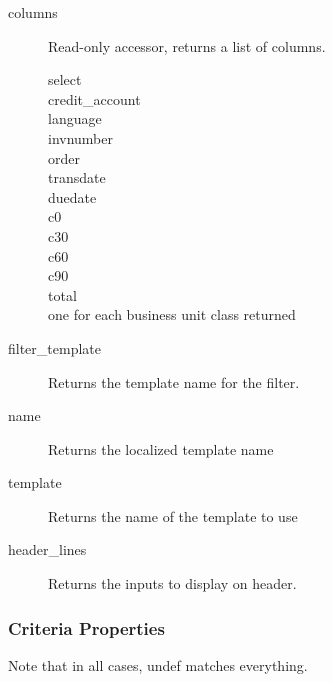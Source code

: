 \begin{description}
\begin{description}
\begin{description}
\begin{description}
\begin{description}
\begin{description}
\begin{description}
\begin{description}
\begin{description}
\begin{description}
\begin{description}
\item[{columns}] \mbox{}

Read-only accessor, returns a list of columns.

\begin{description}

\item[{select}] \mbox{}
\item[{credit\_account}] \mbox{}
\item[{language}] \mbox{}
\item[{invnumber}] \mbox{}
\item[{order}] \mbox{}
\item[{transdate}] \mbox{}
\item[{duedate}] \mbox{}
\item[{c0}] \mbox{}
\item[{c30}] \mbox{}
\item[{c60}] \mbox{}
\item[{c90}] \mbox{}
\item[{total}] \mbox{}
\item[{one for each business unit class returned}] \mbox{}\end{description}

\item[{filter\_template}] \mbox{}

Returns the template name for the filter.


\item[{name}] \mbox{}

Returns the localized template name


\item[{template}] \mbox{}

Returns the name of the template to use


\item[{header\_lines}] \mbox{}

Returns the inputs to display on header.

\end{description}
\subsubsection*{Criteria Properties\label{LedgerSMB::DBObject::Report::Aging_Criteria_Properties}}


Note that in all cases, undef matches everything.

\begin{description}


\end{description}
\end{description}
\end{description}
\end{description}
\end{description}
\end{description}
\end{description}
\end{description}
\end{description}
\end{description}
\end{description}
